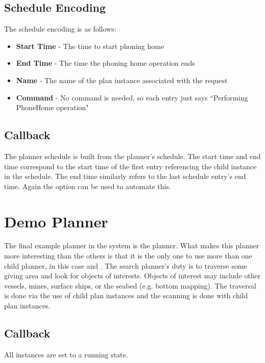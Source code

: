 \subsection{Schedule Encoding}
The schedule encoding is as follows:
\begin{itemize}
\item \textbf{Start Time} - The time to start phoning home
\item \textbf{End Time} - The time the phoning home operation ends
\item \textbf{Name} - The name of the plan instance associated with the  request
\item \textbf{Command} - No command is needed, so each entry just says ``Performing PhoneHome operation"
\end{itemize}

\subsection{Callback }
The  planner schedule is built from the  planner's schedule. The start time and end time correspond to the start time of the first entry referencing the child  instance in the  schedule. The end time similarly refers to the last schedule entry's end time. Again the  option can be used to automate this.

\section{Demo  Planner}
The final example planner in the system is the  planner. What makes this planner more interesting than the others is that it is the only one to use more than one child planner, in this case  and . The search planner's duty is to traverse some giving area and look for objects of interests. Objects of interest may include other vessels, mines, surface ships, or the seabed (e.g. bottom mapping). The traversal is done via the use of child  plan instances and the scanning is done with child  plan instances.

\subsection{Callback }
All instances are set to a running state.

